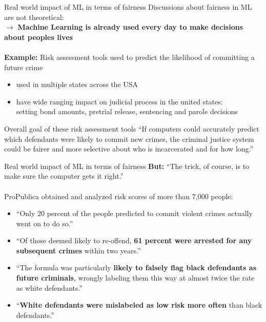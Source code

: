 \begin{frame}{Real world impact of ML in terms of fairness \cite{machinebias}}
    Discussions about fairness in ML are not theoretical: \\
    $\rightarrow$ \textbf{Machine Learning is already used every day to make decisions about peoples lives} \\~\\
    
    \textbf{Example:} Risk assessment tools used to predict the likelihood of committing a future crime
    \begin{itemize}
        \item used in multiple states across the USA
        \item have wide ranging impact on judicial process in the united states: \\
        setting bond amounts, pretrial release, sentencing and parole decisions
    \end{itemize}
    
    \begin{block}{Overall goal of these risk assessment tools}
        \enquote{If computers could accurately predict which defendants were likely to commit new crimes, the criminal justice system could be fairer and more selective about who is incarcerated and for how long.}
    \end{block}
\end{frame}

\begin{frame}{Real world impact of ML in terms of fairness \cite{machinebias}}
    \textbf{But:} \enquote{The trick, of course, is to make sure the computer gets it right.} \\~\\
    
    ProPublica obtained and analyzed risk scores of more than 7,000 people:
    
    \begin{itemize}
        \item \enquote{Only 20 percent of the people predicted to commit violent crimes actually went on to do so.}
        \item \enquote{Of those deemed likely to re-offend, \textbf{61 percent were arrested for any subsequent crimes} within two years.}
        \item \enquote{The formula was particularly \textbf{likely to falsely flag black defendants as future criminals}, wrongly labeling them this way at almost twice the rate as white defendants.}
        \item \enquote{\textbf{White defendants were mislabeled as low risk more often} than black defendants.}
    \end{itemize}
\end{frame}